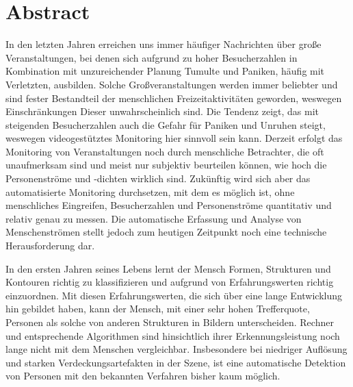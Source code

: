 \chapter*{Abstract}
\label{chap:Abstract}
In den letzten Jahren erreichen uns immer häufiger Nachrichten über große Veranstaltungen, bei denen sich aufgrund zu hoher Besucherzahlen in Kombination mit unzureichender Planung Tumulte und Paniken, häufig mit Verletzten, ausbilden.
Solche Großveranstaltungen werden immer beliebter und sind fester Bestandteil der menschlichen Freizeitaktivitäten geworden, weswegen Einschränkungen Dieser unwahrscheinlich sind. Die Tendenz zeigt, das mit steigenden Besucherzahlen auch die Gefahr für Paniken und Unruhen steigt, weswegen videogestütztes Monitoring hier sinnvoll sein kann. Derzeit erfolgt das Monitoring von Veranstaltungen noch durch menschliche Betrachter, die oft unaufmerksam sind und meist nur subjektiv beurteilen können, wie hoch die Personenströme und -dichten wirklich sind. Zukünftig wird sich aber das automatisierte Monitoring durchsetzen, mit dem es möglich ist, ohne menschliches Eingreifen, Besucherzahlen und Personenströme quantitativ und relativ genau zu messen. Die automatische Erfassung und Analyse von Menschenströmen stellt jedoch zum heutigen Zeitpunkt noch eine technische Herausforderung dar.

In den ersten Jahren seines Lebens lernt der Mensch Formen, Strukturen und Kontouren richtig zu klassifizieren und aufgrund von Erfahrungswerten richtig einzuordnen. Mit diesen Erfahrungswerten, die sich über eine lange Entwicklung hin gebildet haben, kann der Mensch, mit einer sehr hohen Trefferquote, Personen als solche von anderen Strukturen in Bildern unterscheiden. Rechner und entsprechende Algorithmen sind hinsichtlich ihrer Erkennungsleistung noch lange nicht mit dem Menschen vergleichbar. Insbesondere bei niedriger Auflösung und starken Verdeckungsartefakten in der Szene, ist eine automatische Detektion von Personen mit den bekannten Verfahren bisher kaum möglich.

